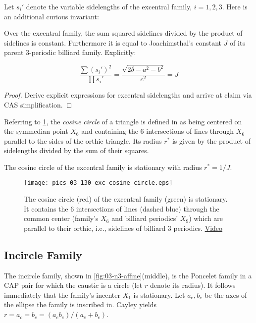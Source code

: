 Let $s_i'$ denote the variable sidelengths of the excentral family, $i=1,2,3$. Here is an additional curious invariant:

\begin{proposition}
Over the excentral family, the sum squared sidelines divided by the product of sidelines is constant. Furthermore it is equal to Joachimsthal's constant $J$ of its parent 3-periodic billiard family. Explicitly:

\[ \frac{\sum{(s_i')^2}}{\prod{s_i'}}=\frac{\sqrt{2\delta-a^2-b^2}}{c^2}={J} \]
\end{proposition}

\begin{proof}
Derive explicit expressions for excentral sidelengths and arrive at claim via CAS simplification.
\end{proof}

Referring to \cref{fig:03-cos-circle}, the {\em cosine circle} of a triangle is defined in \cite[Cosine Circle]{mw} as being centered on the symmedian point $X_6$ and containing the 6 intersections of lines through $X_6$ parallel to the sides of the orthic triangle. Its radius $r^*$ is given by the product of sidelengths divided by the sum of their squares.

\begin{corollary}
The cosine circle of the excentral family is stationary with radius $r^*=1/J$.
\end{corollary}

\begin{figure}
    \centering
    \texttt{[image: pics\_03\_130\_exc\_cosine\_circle.eps]}
    \caption{The cosine circle (red) of the excentral family (green) is stationary. It contains the 6 intersections of lines (dashed blue) through the common center (family's $X_6$ and billiard periodics' $X_9$) which are parallel to their orthic, i.e., sidelines of billiard 3 periodics. \href{https://youtu.be/CrOSI8d8qDc}{Video}}
    \label{fig:03-cos-circle}
\end{figure}

  
\subsection{Incircle Family}
The incircle family, shown in \cref{fig:03-n3-affine}(middle), is the Poncelet family in a CAP pair for which the caustic is a circle (let $r$ denote its radius). It follows immediately that the family's incenter $X_1$ is stationary. Let $a_e,b_e$ be the axes of the ellipse the family is inscribed in. Cayley yields $r=a_c=b_c=(a_e b_e)/(a_e+b_e)$. 

